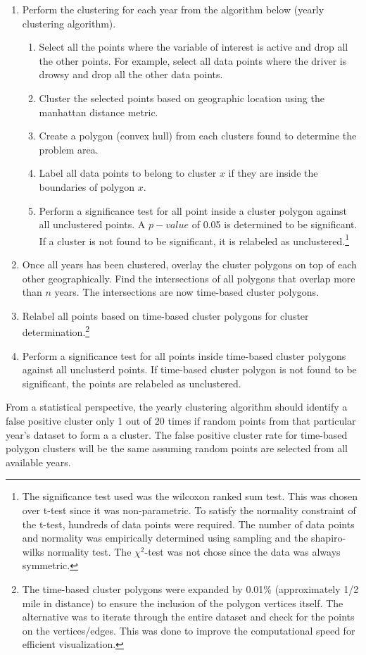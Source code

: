 \documentclass{article}
\begin{document}
\begin{enumerate}
	\item Perform the clustering for each year from the algorithm below (yearly clustering algorithm).
	\begin{enumerate}
			\item Select all the points where the variable of interest is active and drop all the other points. For example, select all data points where the driver is drowsy and drop all the other data points.
			\item Cluster the selected points based on geographic location using the manhattan distance metric.
			\item Create a polygon (convex hull) from each clusters found to determine the problem area.
			\item Label all data points to belong to cluster $x$ if they are inside the boundaries of polygon $x$.
			\item Perform a significance test for all point inside a cluster polygon against all unclustered points. A $p-value$ of 0.05 is determined to be significant. If a cluster is not found to be significant, it is relabeled as unclustered.\footnote{The significance test used was the wilcoxon ranked sum test. This was chosen over t-test since it was non-parametric. To satisfy the normality constraint of the t-test, hundreds of data points were required. The number of data points and normality was empirically determined using sampling and the shapiro-wilks normality test. The $\chi^2$-test was not chose since the data was always symmetric.}
	\end{enumerate}
	\item Once all years has been clustered, overlay the cluster polygons on top of each other geographically. Find the intersections of all polygons that overlap more than $n$ years. The intersections are now time-based cluster polygons.
	\item Relabel all points based on time-based cluster polygons for cluster determination.\footnote{The time-based cluster polygons were expanded by 0.01\% (approximately 1/2 mile in distance) to ensure the inclusion of the polygon vertices itself. The alternative was to iterate through the entire dataset and check for the points on the vertices/edges. This was done to improve the computational speed for efficient visualization.}
	\item Perform a significance test for all points inside time-based cluster polygons against all unclusterd points. If time-based cluster polygon is not found to be significant, the points are relabeled as unclustered.
\end{enumerate}
From a statistical perspective, the yearly clustering algorithm should identify a false positive cluster only 1 out of 20 times if random points from that particular year's dataset to form a a cluster. The false positive cluster rate for time-based polygon clusters will be the same assuming random points are selected from all available years.
\end{document}
